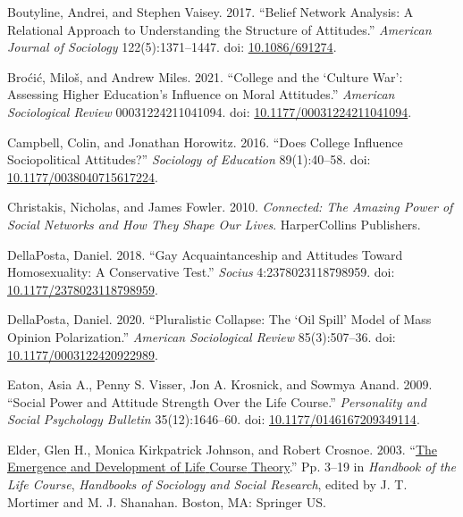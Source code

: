 \documentclass[
  12pt,
]{article}
\newlength{\cslhangindent}
\newlength{\cslentryspacingunit} %
\newenvironment{CSLReferences}[2] %
 {%
  \setlength{\parindent}{0pt}
  \ifodd #1
  \let\oldpar\par
  \def\par{\hangindent=\cslhangindent\oldpar}
  \fi
  \setlength{\parskip}{#2\cslentryspacingunit}
 }%
 {}
\begin{document}
\begin{CSLReferences}{1}{0}
\leavevmode{}%
Boutyline, Andrei, and Stephen Vaisey. 2017. {``Belief {Network}
{Analysis}: {A} {Relational} {Approach} to {Understanding} the
{Structure} of {Attitudes}.''} \emph{American Journal of Sociology}
122(5):1371--1447. doi:
\href{https://doi.org/10.1086/691274}{10.1086/691274}.

\leavevmode{}%
Broćić, Miloš, and Andrew Miles. 2021. {``College and the {`{Culture}
{War}'}: {Assessing} {Higher} {Education}'s {Influence} on {Moral}
{Attitudes}.''} \emph{American Sociological Review} 00031224211041094.
doi:
\href{https://doi.org/10.1177/00031224211041094}{10.1177/00031224211041094}.

\leavevmode{}%
Campbell, Colin, and Jonathan Horowitz. 2016. {``Does {College}
{Influence} {Sociopolitical} {Attitudes}?''} \emph{Sociology of
Education} 89(1):40--58. doi:
\href{https://doi.org/10.1177/0038040715617224}{10.1177/0038040715617224}.

\leavevmode{}%
Christakis, Nicholas, and James Fowler. 2010. \emph{Connected: {The}
{Amazing} {Power} of {Social} {Networks} and {How} {They} {Shape} {Our}
{Lives}}. HarperCollins Publishers.

\leavevmode{}%
DellaPosta, Daniel. 2018. {``Gay {Acquaintanceship} and {Attitudes}
Toward {Homosexuality}: {A} {Conservative} {Test}.''} \emph{Socius}
4:2378023118798959. doi:
\href{https://doi.org/10.1177/2378023118798959}{10.1177/2378023118798959}.

\leavevmode{}%
DellaPosta, Daniel. 2020. {``Pluralistic {Collapse}: {The} {`{Oil}
{Spill}'} {Model} of {Mass} {Opinion} {Polarization}.''} \emph{American
Sociological Review} 85(3):507--36. doi:
\href{https://doi.org/10.1177/0003122420922989}{10.1177/0003122420922989}.

\leavevmode{}%
Eaton, Asia A., Penny S. Visser, Jon A. Krosnick, and Sowmya Anand.
2009. {``Social {Power} and {Attitude} {Strength} {Over} the {Life}
{Course}.''} \emph{Personality and Social Psychology Bulletin}
35(12):1646--60. doi:
\href{https://doi.org/10.1177/0146167209349114}{10.1177/0146167209349114}.

\leavevmode{}%
Elder, Glen H., Monica Kirkpatrick Johnson, and Robert Crosnoe. 2003.
{``\href{https://doi.org/10.1007/978-0-306-48247-2_1}{The {Emergence}
and {Development} of {Life} {Course} {Theory}}.''} Pp. 3--19 in
\emph{Handbook of the {Life} {Course}}, \emph{Handbooks of {Sociology}
and {Social} {Research}}, edited by J. T. Mortimer and M. J. Shanahan.
Boston, MA: Springer US.


\end{CSLReferences}
\end{document}

